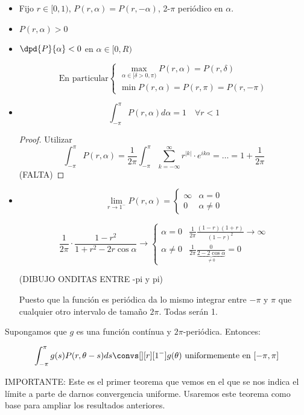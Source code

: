 		\begin{itemize}

			\item Fijo $r \in [0,1)$, $P(r,\alpha) = P(r,-\alpha)$, 2-$\pi$ periódico en $\alpha$.

			\item $P(r,\alpha) > 0$

			\item $\dpd{P}{\alpha} < 0$ en $\alpha \in [0,R)$

			\[ \text{En particular} \begin{cases}
				\max_{\alpha \in [\delta > 0, \pi)} P(r,\alpha) = P(r,\delta) \\
				\min P(r,\alpha) = P(r,\pi) = P(r,-\pi)
			\end{cases} \]

			\item \[
				\int_{-\pi}^\pi P(r, \alpha) d\alpha = 1 \quad \forall r < 1
			\]

			\begin{proof}
				Utilizar \[ \int_{-\pi}^\pi P(r, \alpha) = \frac{1}{2\pi} \int_{-\pi}^\pi \sum_{k=-\infty}^{\infty} r^{|k|} \cdot e^{ik\alpha}  = … = 1 + \frac{1}{2\pi}  \]
				(FALTA)
			\end{proof}


			\item \[
			\lim_{r \to 1^-} P(r, \alpha) = \begin{cases}
				\infty & \alpha = 0 \\
				0 & \alpha \neq 0
			\end{cases}
			\]

			\[
				\frac{1}{2\pi} \cdot \frac{1-r^2}{1+r^2-2r\cos \alpha} \rightarrow \begin{cases}
				\alpha = 0 & \frac{1}{2\pi} \frac{(1-r)(1+r)}{(1-r)^2} \rightarrow \infty \\
				\alpha \neq 0  & \frac{1}{2\pi} \frac{0}{\underbrace{2-2\cos \alpha}_{\neq 0}} = 0
				\end{cases}
			\]

			(DIBUJO ONDITAS ENTRE -pi y pi)

			Puesto que la función es periódica da lo mismo integrar entre $-\pi$ y $\pi$ que cualquier otro intervalo de tamaño $2\pi$. Todas serán 1.

		\end{itemize}

		\begin{theorem}
			Supongamos que $g$ es una función contínua y $2\pi$-periódica. Entonces:

			\[ \int^\pi_{-\pi} g(s)P(r, \theta-s) ds \convs[][r][1^-] g(\theta) \text{ uniformemente en } [-\pi,\pi] \]

			IMPORTANTE: Este es el primer teorema que vemos en el que se nos indica el límite a parte de darnos convergencia uniforme. Usaremos este teorema como base para ampliar los resultados anteriores.
		\end{theorem}


